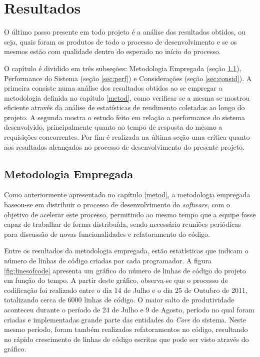 \chapter{Resultados}
\label{chap:result}
O último passo presente em todo projeto é a análise dos resultados obtidos, ou seja, quais foram os produtos de todo o processo de desenvolvimento e se os mesmos estão com qualidade dentro do esperado no início do processo. 

O capítulo é dividido em três subseções: Metodologia Empregada (seção \ref{sec:metod}), Performance do Sistema (seção \ref{sec:perf}) e Considerações (seção \ref{sec:consid}). A primeira consiste numa análise dos resultados obtidos ao se empregar a metodologia definida no capítulo \ref{metod}, como verificar se a mesma se mostrou eficiente através da análise de estatísticas de rendimento coletadas ao longo do projeto. A segunda mostra o estudo feito em relação a performance do sistema desenvolvido, principalmente quanto ao tempo de resposta do mesmo a requisições concorrentes. Por fim é realizada na última seção uma crítica quanto aos resultados alcançados no processo de desenvolvimento do presente projeto.

\section{Metodologia Empregada}
\label{sec:metod}
Como anteriormente apresentado no capítulo \ref{metod}, a metodologia empregada baseou-se em distribuir o processo de desenvolvimento do \emph{software}, com o objetivo de acelerar este processo, permitindo ao mesmo tempo que a equipe fosse capaz de trabalhar de forma distribuída, sendo necessário reuniões periódicas para discussão de novas funcionalidades e refatoramento do código.

Entre os resultados da metodologia empregada, estão estatísticas que indicam o número de linhas de código criadas por cada programador.
A figura \ref{fig:linesofcode} apresenta um gráfico do número de linhas de código do projeto em função do tempo.
A partir deste gráfico, observa-se que o processo de codificação foi realizado entre o dia 14 de Julho e o dia 25 de Outubro de 2011, totalizando cerca de 6000 linhas de código.
O maior salto de produtividade aconteceu durante o período de 24 de Julho e 9 de Agosto, período no qual foram criadas e implementadas grande parte das entidades do \emph{Core} do sistema.
Neste mesmo período, foram também realizados refatoramentos no código, resultando no rápido crescimento de linhas de código escritas que pode ser visto através do gráfico.

